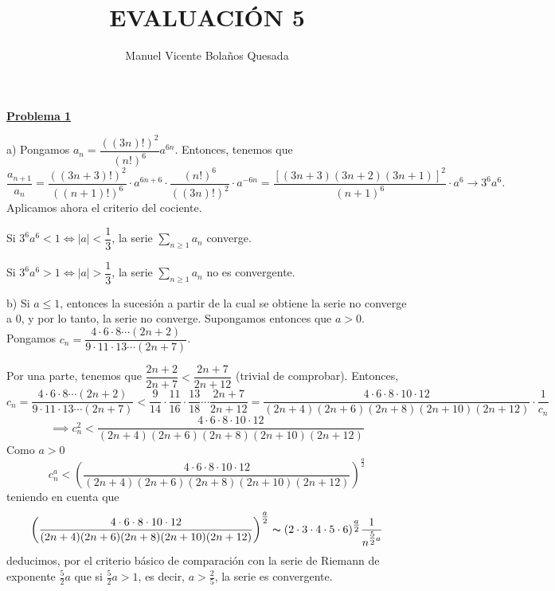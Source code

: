 \documentclass[10pt,a4paper]{article}
\begin{document}
	\title{EVALUACIÓN 5}
	\author{Manuel Vicente Bolaños Quesada}
	\date{}
	\maketitle
	
	
	\begin{flushleft}
		\textbf{\underline{Problema 1}}
	\end{flushleft}
	
	a) Pongamos $a_n = \dfrac{((3n)!) ^2}{(n!) ^6} a ^{6n}$. Entonces, tenemos que $$\dfrac{a_{n+1}}{a_n} = \dfrac{((3n+3)!) ^2}{((n+1)!) ^6} \cdot a ^{6n+6} \cdot \dfrac{(n!) ^6}{((3n)!) ^2} \cdot a^{-6n} = \dfrac{[(3n+3)(3n+2)(3n+1)]^2}{(n+1)^6}\cdot a^6 \rightarrow 3^6 a^6.$$
	Aplicamos ahora el criterio del cociente.
	
	Si $3^6 a^6 < 1 \Leftrightarrow |a| < \dfrac{1}{3}$, la serie $\displaystyle\sum_{n \geq 1} a_n$ converge. 
	
	Si $3^6a^6 > 1 \Leftrightarrow |a| > \dfrac{1}{3}$, la serie $\displaystyle\sum_{n \geq 1} a_n$ no es convergente. \newline
	
	
	b) Si $a \leq 1$, entonces la sucesión a partir de la cual se obtiene la serie no converge a $0$, y por lo tanto, la serie no converge. Supongamos entonces que $a > 0$. Pongamos $c_n = \dfrac{4 \cdot 6 \cdot 8 \cdots (2n+2)}{9 \cdot 11 \cdot 13 \cdots (2n+7)}$. \newline
	
	Por una parte, tenemos que $\dfrac{2n+2}{2n+7} < \dfrac{2n+7}{2n+12}$ (trivial de comprobar).  Entonces, 
	$$ c_n = \dfrac{4 \cdot 6 \cdot 8 \cdots (2n+2)}{9 \cdot 11 \cdot 13 \cdots (2n+7)} < \dfrac{9}{14} \cdot \dfrac{11}{16} \cdot \dfrac{13}{18} \cdots \dfrac{2n+7}{2n+12} = \dfrac{4 \cdot 6 \cdot 8 \cdot 10 \cdot 12}{(2n+4)(2n+6)(2n+8)(2n+10)(2n+12)} \cdot \dfrac{1}{c_n}$$
	$$ \implies c_n^2 < \dfrac{4 \cdot 6 \cdot 8 \cdot 10 \cdot 12}{(2n+4)(2n+6)(2n+8)(2n+10)(2n+12)}$$
	Como $a > 0$
 	$$c_n^a < \left(\dfrac{4 \cdot 6 \cdot 8 \cdot 10 \cdot 12}{(2n+4)(2n+6)(2n+8)(2n+10)(2n+12)}\right) ^{\tfrac{a}{2}}$$
 	teniendo en cuenta que
 	$$\left(\dfrac{4 \cdot 6 \cdot 8 \cdot 10 \cdot 12}{(2n+4)(2n+6)(2n+8)(2n+10)(2n+12)}\right) ^{\tfrac{a}{2}} \thicksim (2 \cdot 3 \cdot 4 \cdot 5 \cdot 6) ^{\tfrac{a}{2}} \dfrac{1}{n^{\tfrac{5}{2}a}}$$ 	
	deducimos, por el criterio básico de comparación con la serie de Riemann de exponente $\frac{5}{2} a$ que si $\frac{5}{2} a > 1$, es decir, $a > \frac{2}{5}$, la serie es convergente. \newline
	
\end{document}
